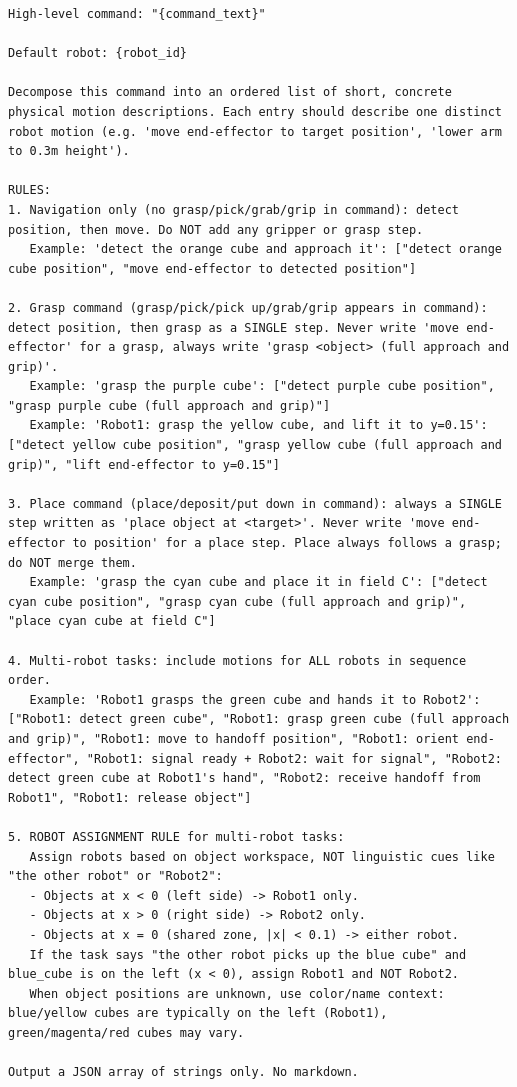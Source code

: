\documentclass[
     12pt,
     a4paper,
     BCOR=10mm,
     DIV=14,
     listof=totoc,
     bibliography=totoc,
     parskip,
     twoside,
     headsepline
     ]{scrreprt}
\begin{document}
\begin{lstlisting}[caption={Motion decomposition prompt (inspired by RT-H)}, extendedchars=true]
High-level command: "{command_text}"

Default robot: {robot_id}

Decompose this command into an ordered list of short, concrete physical motion descriptions. Each entry should describe one distinct robot motion (e.g. 'move end-effector to target position', 'lower arm to 0.3m height').

RULES:
1. Navigation only (no grasp/pick/grab/grip in command): detect position, then move. Do NOT add any gripper or grasp step.
   Example: 'detect the orange cube and approach it': ["detect orange cube position", "move end-effector to detected position"]

2. Grasp command (grasp/pick/pick up/grab/grip appears in command): detect position, then grasp as a SINGLE step. Never write 'move end-effector' for a grasp, always write 'grasp <object> (full approach and grip)'.
   Example: 'grasp the purple cube': ["detect purple cube position", "grasp purple cube (full approach and grip)"]
   Example: 'Robot1: grasp the yellow cube, and lift it to y=0.15': ["detect yellow cube position", "grasp yellow cube (full approach and grip)", "lift end-effector to y=0.15"]

3. Place command (place/deposit/put down in command): always a SINGLE step written as 'place object at <target>'. Never write 'move end-effector to position' for a place step. Place always follows a grasp; do NOT merge them.
   Example: 'grasp the cyan cube and place it in field C': ["detect cyan cube position", "grasp cyan cube (full approach and grip)", "place cyan cube at field C"]

4. Multi-robot tasks: include motions for ALL robots in sequence order.
   Example: 'Robot1 grasps the green cube and hands it to Robot2': ["Robot1: detect green cube", "Robot1: grasp green cube (full approach and grip)", "Robot1: move to handoff position", "Robot1: orient end-effector", "Robot1: signal ready + Robot2: wait for signal", "Robot2: detect green cube at Robot1's hand", "Robot2: receive handoff from Robot1", "Robot1: release object"]

5. ROBOT ASSIGNMENT RULE for multi-robot tasks:
   Assign robots based on object workspace, NOT linguistic cues like "the other robot" or "Robot2":
   - Objects at x < 0 (left side) -> Robot1 only.
   - Objects at x > 0 (right side) -> Robot2 only.
   - Objects at x = 0 (shared zone, |x| < 0.1) -> either robot.
   If the task says "the other robot picks up the blue cube" and blue_cube is on the left (x < 0), assign Robot1 and NOT Robot2.
   When object positions are unknown, use color/name context: blue/yellow cubes are typically on the left (Robot1), green/magenta/red cubes may vary.

Output a JSON array of strings only. No markdown.
\end{lstlisting}
\end{document}
